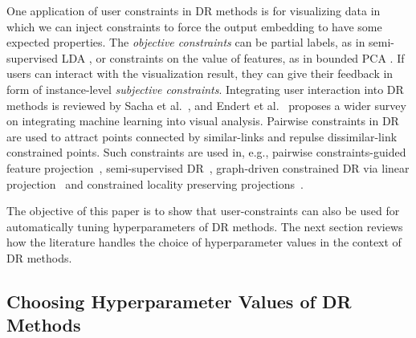 One application of user constraints in DR methods is for visualizing data in which we can inject constraints to force the output embedding to have some expected properties.
The \emph{objective constraints} can be partial labels, as in semi-supervised LDA \cite{Sugiyama2008SELF}, or constraints on the value of features, as in bounded PCA \cite{giordani2007bpca}. 
If users can interact with the visualization result, they can give their feedback in form of instance-level \emph{subjective constraints}.
Integrating user interaction into DR methods is reviewed by Sacha et al.~\cite{Sacha2017Interaction}, and Endert et al.~\cite{Endert2017SOTA} proposes a wider survey on integrating machine learning into visual analysis.
Pairwise constraints in DR are used to attract points connected by similar-links and repulse dissimilar-link constrained points. Such constraints are used in, e.g., pairwise constraints-guided feature projection~\cite{tang2007pairwise}, semi-supervised DR~\cite{zhang2007ssdr}, graph-driven constrained DR via linear projection~\cite{davidson2009gcdr} and constrained locality preserving projections~\cite{cevikalp2008CLPP}.

The objective of this paper is to show that user-constraints can also be used for automatically tuning hyperparameters of DR methods. The next section reviews how the literature handles the choice of hyperparameter values in the context of DR methods.

\subsection{Choosing Hyperparameter Values of DR Methods}\label{subsec:tune_HP}

